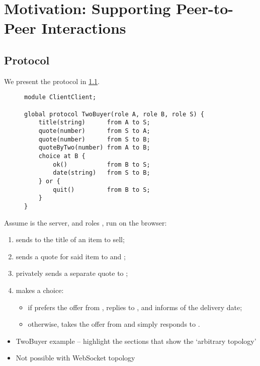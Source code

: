 \chapter{Motivation: Supporting Peer-to-Peer Interactions}
\label{chap:p2p}

\section{ Protocol}

We present the  protocol in \cref{lst:twobuyer}.

\begin{figure}[!ht]
\begin{lstlisting}[language=Scribble, tabsize=2]
module ClientClient;

global protocol TwoBuyer(role A, role B, role S) {
	title(string)      from A to S;
	quote(number)      from S to A;
	quote(number)      from S to B;
	quoteByTwo(number) from A to B;
	choice at B {
		ok()           from B to S;
		date(string)   from S to B;
	} or {
		quit()         from B to S;
	}
}
\end{lstlisting}
\label{lst:twobuyer}
\end{figure}

Assume  is the server, and roles ,  run on the 
browser:

\begin{enumerate}
\item {} sends to  the title of an item to sell;
\item {} sends a quote for said item to  and ;
\item {} privately sends a separate quote to ;
\item {} makes a choice:
\begin{itemize}
\item if  prefers the offer from , 
 replies  to , and  informs
 of the delivery date;

\item otherwise,  takes the offer from  and simply
responds  to .
\end{itemize} 
\end{enumerate}

\begin{itemize}
\item TwoBuyer example -- highlight the sections that show the `arbitrary topology'
\item Not possible with WebSocket topology
\end{itemize}


